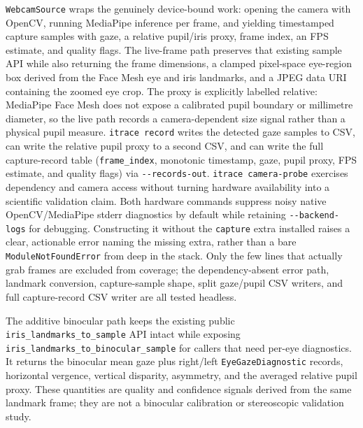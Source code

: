 \documentclass[
]{article}
\begin{document}
\texttt{WebcamSource} wraps the genuinely device-bound work: opening the
camera with OpenCV, running MediaPipe inference per frame, and yielding
timestamped capture samples with gaze, a relative pupil/iris proxy,
frame index, an FPS estimate, and quality flags. The live-frame path
preserves that existing sample API while also returning the frame
dimensions, a clamped pixel-space eye-region box derived from the Face
Mesh eye and iris landmarks, and a JPEG data URI containing the zoomed
eye crop. The proxy is explicitly labelled relative: MediaPipe Face Mesh
does not expose a calibrated pupil boundary or millimetre diameter, so
the live path records a camera-dependent size signal rather than a
physical pupil measure. \texttt{itrace\ record} writes the detected gaze
samples to CSV, can write the relative pupil proxy to a second CSV, and
can write the full capture-record table (\texttt{frame\_index},
monotonic timestamp, gaze, pupil proxy, FPS estimate, and quality flags)
via \texttt{-\/-records-out}. \texttt{itrace\ camera-probe} exercises
dependency and camera access without turning hardware availability into
a scientific validation claim. Both hardware commands suppress noisy
native OpenCV/MediaPipe stderr diagnostics by default while retaining
\texttt{-\/-backend-logs} for debugging. Constructing it without the
\texttt{capture} extra installed raises a clear, actionable error naming
the missing extra, rather than a bare \texttt{ModuleNotFoundError} from
deep in the stack. Only the few lines that actually grab frames are
excluded from coverage; the dependency-absent error path, landmark
conversion, capture-sample shape, split gaze/pupil CSV writers, and full
capture-record CSV writer are all tested headless.

The additive binocular path keeps the existing public
\texttt{iris\_landmarks\_to\_sample} API intact while exposing
\texttt{iris\_landmarks\_to\_binocular\_sample} for callers that need
per-eye diagnostics. It returns the binocular mean gaze plus right/left
\texttt{EyeGazeDiagnostic} records, horizontal vergence, vertical
disparity, asymmetry, and the averaged relative pupil proxy. These
quantities are quality and confidence signals derived from the same
landmark frame; they are not a binocular calibration or stereoscopic
validation study.
\end{document}
